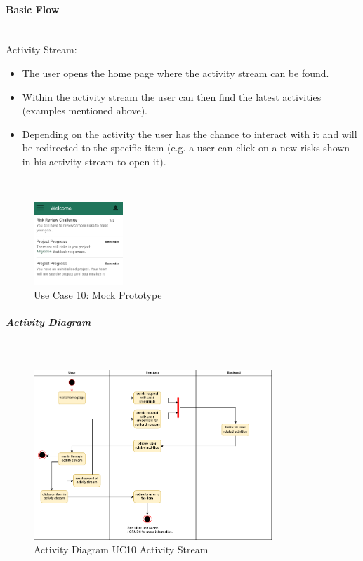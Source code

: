 \paragraph*{Basic Flow} \mbox{}\\
\noindent
Activity Stream: 
\begin{itemize}
	\vspace{-3mm}
	\setlength\itemsep{-1em}
	\item The user opens the home page where the activity stream can be found.
	\item Within the activity stream the user can then find the latest activities (examples mentioned above).
	\item Depending on the activity the user has the chance to interact with it and will be redirected to the specific item (e.g. a user can click on a new risks shown in his activity stream to open it).
\end{itemize} 
\\
\begin{figure}[H]
	\centering
	\includegraphics[width=0.3\textwidth]{Assets/UC_Screenshots/UC10S.png}
	\caption{Use Case 10: Mock Prototype}
	\label{fig:useCase10Detail}
\end{figure}
\newpage
\subparagraph{Activity Diagram}\mbox{}\\
\begin{figure}[H]
	\centering
	\includegraphics[width=0.8\textwidth]{Content/Domain/UC10ActivityStream.png}
	\caption{Activity Diagram \ac{UC}10 Activity Stream}
	\label{fig:label11}
\end{figure}

